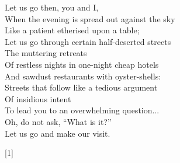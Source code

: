 \documentclass{article}
\begin{document}
\begin{multicols}{2}
\begin{minipage}{9cm}
\begin{center}
\begin{turn}{-90}
\begin{minipage}{8cm}
    \flushright
    Let us go then, you and I,\\
    When the evening is spread out against the sky\\
    Like a patient etherised upon a table;\\
    Let us go through certain half-deserted streets\\
    The muttering retreats\\
    Of restless nights in one-night cheap hotels\\
    And sawdust restaurants with oyster-shells:\\
    Streets that follow like a tedious argument\\
    Of insidious intent\\
    To lead you to an overwhelming question...\\
    Oh, do not ask, ``What is it?''\\
    Let us go and make our visit.\\
    \begin{center}[1]\end{center}
\end{minipage}
\end{turn}
\end{center}
\end{minipage}

\end{multicols}

\begin{center}
\end{center}

\bigskip
\end{document}
